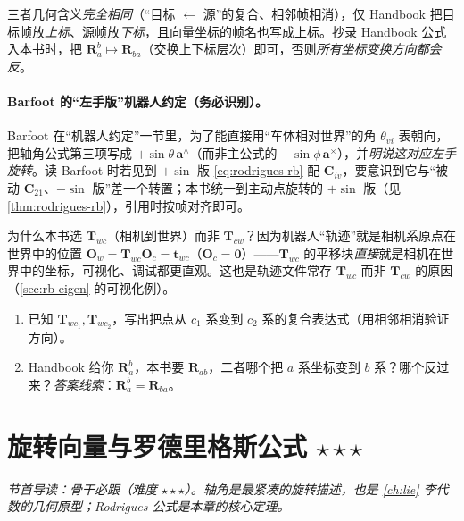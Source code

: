 \noindent 三者几何含义\emph{完全相同}（“目标 $\leftarrow$ 源”的复合、相邻帧相消），仅 Handbook 把目标帧放\emph{上标}、源帧放\emph{下标}，且向量坐标的帧名也写成上标。抄录 Handbook 公式入本书时，把 $\mathbf{R}_a^b\mapsto\mathbf{R}_{ba}$（交换上下标层次）即可，否则\emph{所有坐标变换方向都会反}。

\paragraph{Barfoot 的“左手版”机器人约定（务必识别）。}Barfoot 在“机器人约定”一节里，为了能直接用“车体相对世界”的角 $\theta_{vi}$ 表朝向，把轴角公式第三项写成 $+\sin\theta\,\mathbf{a}^\wedge$（而非主公式的 $-\sin\phi\,\mathbf{a}^\times$），并\emph{明说这对应左手旋转}\cite{barfoot2024state}。读 Barfoot 时若见到 $+\sin$ 版 \cref{eq:rodrigues-rb} 配 $\mathbf{C}_{iv}$，要意识到它与“被动 $\mathbf{C}_{21}$、$-\sin$ 版”差一个转置；本书统一到主动点旋转的 $+\sin$ 版（见 \cref{thm:rodrigues-rb}），引用时按帧对齐即可。

\begin{insight}
为什么本书选 $\mathbf{T}_{wc}$（相机到世界）而非 $\mathbf{T}_{cw}$？因为机器人“轨迹”就是相机系原点在世界中的位置 $\mathbf{O}_w=\mathbf{T}_{wc}\mathbf{O}_c=\mathbf{t}_{wc}$（$\mathbf{O}_c=\mathbf{0}$）——$\mathbf{T}_{wc}$ 的平移块\emph{直接}就是相机在世界中的坐标，可视化、调试都更直观\cite{gaoxiang2019slam14}。这也是轨迹文件常存 $\mathbf{T}_{wc}$ 而非 $\mathbf{T}_{cw}$ 的原因（\cref{sec:rb-eigen} 的可视化例）。
\end{insight}

\begin{practice}
\begin{enumerate}
  \item 已知 $\mathbf{T}_{wc_1},\mathbf{T}_{wc_2}$，写出把点从 $c_1$ 系变到 $c_2$ 系的复合表达式（用相邻相消验证方向）。
  \item Handbook 给你 $\mathbf{R}_a^b$，本书要 $\mathbf{R}_{ab}$，二者哪个把 $a$ 系坐标变到 $b$ 系？哪个反过来？\emph{答案线索}：$\mathbf{R}_a^b=\mathbf{R}_{ba}$。
\end{enumerate}
\end{practice}

\section{旋转向量与罗德里格斯公式 \texorpdfstring{$\star\star\star$}{***}}
\label{sec:rb-axisangle}
\noindent\emph{节首导读：骨干必跟（难度 $\star\star\star$）。轴角是最紧凑的旋转描述，也是 \cref{ch:lie} 李代数的几何原型；Rodrigues 公式是本章的核心定理。}

